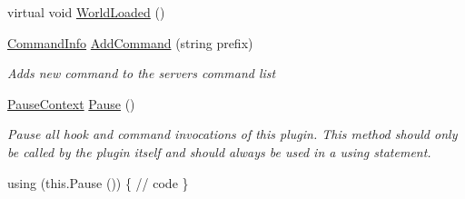 \begin{DoxyCompactItemize}
virtual void \hyperlink{class_o_t_a_1_1_plugin_1_1_base_plugin_a56703883c56ae6b32e830a709a788397}{World\+Loaded} ()
\item 
\hyperlink{class_o_t_a_1_1_command_1_1_command_info}{Command\+Info} \hyperlink{class_o_t_a_1_1_plugin_1_1_base_plugin_a07527facd41ec4c7e49b033519fe503d}{Add\+Command} (string prefix)
\begin{DoxyCompactList}\small\item\em Adds new command to the server\textquotesingle{}s command list \end{DoxyCompactList}\item 
\hyperlink{class_o_t_a_1_1_plugin_1_1_base_plugin_1_1_pause_context}{Pause\+Context} \hyperlink{class_o_t_a_1_1_plugin_1_1_base_plugin_a982908bf439264f3192b982e6fed8c60}{Pause} ()
\begin{DoxyCompactList}\small\item\em Pause all hook and command invocations of this plugin. This method should only be called by the plugin itself and should always be used in a using statement. 

using (this.\+Pause ()) \{ // code \} \end{DoxyCompactList}\end{DoxyCompactItemize}

